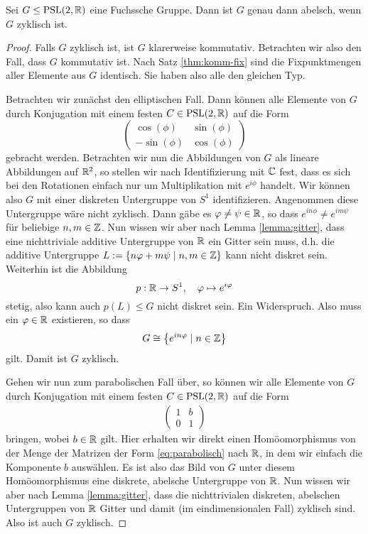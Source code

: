 \begin{thm}
  \label{thm:abelsch-zyklisch}
  Sei $G \leq \operatorname{PSL}(2, \mathbb{R})$ eine Fuchssche Gruppe. Dann ist $G$ genau
  dann abelsch, wenn $G$ zyklisch ist.
\end{thm}

\begin{proof}
  Falls $G$ zyklisch ist, ist $G$ klarerweise kommutativ. Betrachten
  wir also den Fall, dass $G$ kommutativ ist. Nach Satz
  \ref{thm:komm-fix} sind die Fixpunktmengen aller Elemente aus $G$
  identisch. Sie haben also alle den gleichen Typ.

  Betrachten wir zunächst den elliptischen Fall. Dann können alle
  Elemente von $G$ durch Konjugation mit einem festen $C \in \operatorname{PSL}(2,\mathbb{R})$ auf
  die Form
  \[
  \begin{pmatrix}
    \cos(\phi) & \sin(\phi) \\
    -\sin(\phi) & \cos(\phi)
  \end{pmatrix}
  \]
  gebracht werden. Betrachten wir nun die Abbildungen von $G$ als
  lineare Abbildungen auf $\mathbb{R}^2$, so stellen wir nach Identifizierung
  mit $\mathbb{C}$ fest, dass es sich bei den Rotationen einfach nur um
  Multiplikation mit $e^{i\phi}$ handelt. Wir können also $G$ mit
  einer diskreten Untergruppe von $S^1$ identifizieren. Angenommen
  diese Untergruppe wäre nicht zyklisch. Dann gäbe es $\varphi \neq \psi
  \in \mathbb{R}$, so dass $e^{in\phi} \neq e^{im\psi}$ für beliebige $n, m
  \in \mathbb{Z}$. Nun wissen wir aber nach Lemma \ref{lemma:gitter}, dass
  eine nichttriviale additive Untergruppe von $\mathbb{R}$ ein Gitter sein
  muss, d.h. die additive Untergruppe $L := \{ n \varphi + m \psi \mid n,m \in
  \mathbb{Z}\}$ kann nicht diskret sein. Weiterhin ist die Abbildung
  \[
  p: \mathbb{R} \rightarrow S^1, \quad \varphi \mapsto e^{i\varphi}
  \]
  stetig, also kann auch $p(L) \leq G$ nicht diskret sein. Ein
  Widerspruch. Also muss ein $\varphi \in \mathbb{R}$ existieren, so dass
  \[
  G \cong \left \{ e^{in\varphi} \mid n \in \mathbb{Z} \right \}
  \]
  gilt. Damit ist $G$ zyklisch.

  Gehen wir nun zum parabolischen Fall über, so können wir alle
  Elemente von $G$ durch Konjugation mit einem festen $C \in \operatorname{PSL}(2,
  \mathbb{R})$ auf die Form
  \begin{align}
    \label{eq:parabolisch}
  \begin{pmatrix}
    1 & b\\
    0 & 1
  \end{pmatrix}
  \end{align}
  bringen, wobei $b \in \mathbb{R}$ gilt. Hier erhalten wir direkt einen
  Homöomorphismus von der Menge der Matrizen der Form
  \eqref{eq:parabolisch} nach $\mathbb{R}$, in dem wir einfach die Komponente
  $b$ auswählen. Es ist also das Bild von $G$ unter diesem
  Homöomorphismus eine diskrete, abelsche
  Untergruppe von $\mathbb{R}$. Nun wissen wir aber nach Lemma \ref{lemma:gitter},
  dass die nichttrivialen diskreten, abelschen Untergruppen von $\mathbb{R}$ Gitter und
  damit (im eindimensionalen Fall) zyklisch sind. Also ist auch $G$
  zyklisch.


\end{proof}
